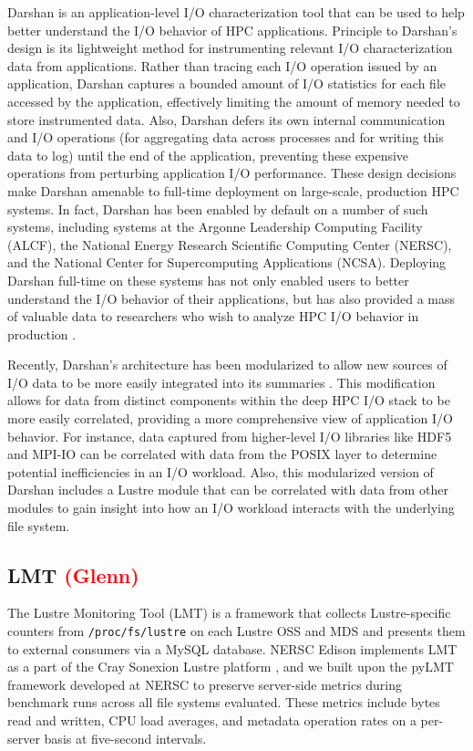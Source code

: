 \documentclass[conference,10pt,compsocconf]{IEEEtran}
\newcommand{\assign}[1]{\textcolor{red}{(#1)}}
\begin{document}
Darshan is an application-level I/O characterization tool that can be used to
help better understand the I/O behavior of HPC applications. Principle to
Darshan's design is its lightweight method for instrumenting relevant I/O
characterization data from applications. Rather than tracing each I/O operation
issued by an application, Darshan captures a bounded amount of I/O statistics
for each file accessed by the application, effectively limiting the amount of
memory needed to store instrumented data. Also, Darshan defers its own internal
communication and I/O operations (for aggregating data across processes and for
writing this data to log) until the end of the application, preventing these
expensive operations from perturbing application I/O performance. These design
decisions make Darshan amenable to full-time deployment on large-scale,
production HPC systems. In fact, Darshan has been enabled by default on a number
of such systems, including systems at the Argonne Leadership Computing Facility
(ALCF), the National Energy Research Scientific Computing Center (NERSC), and
the National Center for Supercomputing Applications (NCSA). Deploying Darshan
full-time on these systems has not only enabled users to better understand the
I/O behavior of their applications, but has also provided a mass of valuable
data to researchers who wish to analyze HPC I/O behavior in production
\cite{carns200924,carns2011understanding,luu2015multiplatform,snyder2015techniques}.

Recently, Darshan's architecture has been modularized to allow new sources
of I/O data to be more easily integrated into its summaries \cite{snyder2016modular}.
This modification allows for data from distinct components within the deep
HPC I/O stack to be more easily correlated, providing a more comprehensive view
of application I/O behavior. For instance, data captured from higher-level I/O
libraries like HDF5 and MPI-IO can be correlated with data from the POSIX layer
to determine potential inefficiencies in an I/O workload. Also, this modularized
version of Darshan includes a Lustre module that can be correlated with data from
other modules to gain insight into how an I/O workload interacts with the
underlying file system.

\subsection{LMT \assign{Glenn}} \label{sec:methods/lmt}

The Lustre Monitoring Tool (LMT) is a framework that collects Lustre-specific
counters from \texttt{/proc/fs/lustre} on each Lustre OSS and MDS and presents
them to external consumers via a MySQL database.  NERSC Edison implements LMT
as a part of the Cray Sonexion Lustre platform \cite{Keopp2014}, and we built
upon the pyLMT framework developed at NERSC \cite{Uselton2009} to preserve
server-side metrics during benchmark runs across all file systems evaluated.
These metrics include bytes read and written, CPU load averages, and metadata
operation rates on a per-server basis at five-second intervals.
\end{document}
